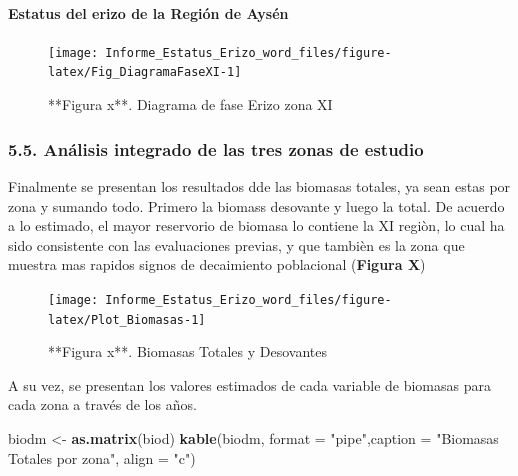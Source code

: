 \documentclass[
]{article}
\newenvironment{Shaded}{\begin{snugshade}}{\end{snugshade}}
\newcommand{\DataTypeTok}[1]{\textcolor[rgb]{0.13,0.29,0.53}{#1}}
\newcommand{\KeywordTok}[1]{\textcolor[rgb]{0.13,0.29,0.53}{\textbf{#1}}}
\newcommand{\NormalTok}[1]{#1}
\newcommand{\StringTok}[1]{\textcolor[rgb]{0.31,0.60,0.02}{#1}}
\begin{document}
\hypertarget{estatus-del-erizo-de-la-regiuxf3n-de-aysuxe9n}{%
\paragraph{Estatus del erizo de la Región de
Aysén}\label{estatus-del-erizo-de-la-regiuxf3n-de-aysuxe9n}}

\begin{figure}

{\centering \texttt{[image: Informe\_Estatus\_Erizo\_word\_files/figure-latex/Fig\_DiagramaFaseXI-1]} 

}

\caption{**Figura x**. Diagrama de fase Erizo zona XI}\label{fig:Fig_DiagramaFaseXI}
\end{figure}

\hypertarget{anuxe1lisis-integrado-de-las-tres-zonas-de-estudio}{%
\subsubsection{5.5. Análisis integrado de las tres zonas de
estudio}\label{anuxe1lisis-integrado-de-las-tres-zonas-de-estudio}}

Finalmente se presentan los resultados dde las biomasas totales, ya sean
estas por zona y sumando todo. Primero la biomass desovante y luego la
total. De acuerdo a lo estimado, el mayor reservorio de biomasa lo
contiene la XI regiòn, lo cual ha sido consistente con las evaluaciones
previas, y que tambièn es la zona que muestra mas rapidos signos de
decaimiento poblacional (\textbf{Figura X})

\begin{figure}

{\centering \texttt{[image: Informe\_Estatus\_Erizo\_word\_files/figure-latex/Plot\_Biomasas-1]} 

}

\caption{**Figura x**. Biomasas Totales y Desovantes}\label{fig:Plot_Biomasas}
\end{figure}

A su vez, se presentan los valores estimados de cada variable de
biomasas para cada zona a través de los años.

\begin{Shaded}
\begin{Highlighting}[]
\NormalTok{biodm \textless{}{-}}\StringTok{ }\KeywordTok{as.matrix}\NormalTok{(biod)}
\KeywordTok{kable}\NormalTok{(biodm, }\DataTypeTok{format =} \StringTok{"pipe"}\NormalTok{,}\DataTypeTok{caption =} \StringTok{"Biomasas Totales por zona"}\NormalTok{, }\DataTypeTok{align =} \StringTok{"c"}\NormalTok{)}
\end{Highlighting}
\end{Shaded}
\end{document}
